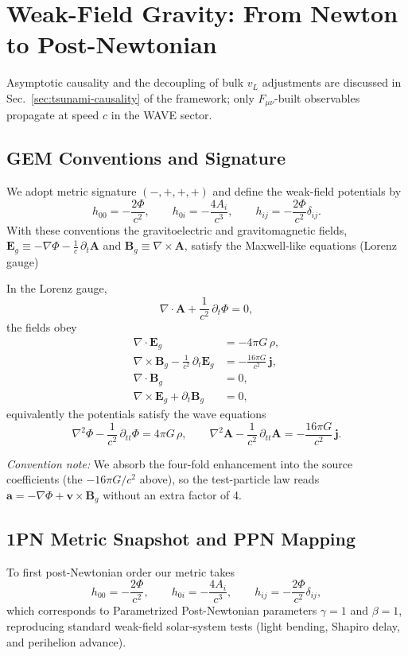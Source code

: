\section{Weak-Field Gravity: From Newton to Post-Newtonian}
Asymptotic causality and the decoupling of bulk $v_L$ adjustments are discussed in Sec.~\ref{sec:tsunami-causality} of the framework; only $F_{\mu\nu}$-built observables propagate at speed $c$ in the WAVE sector.


\subsection*{GEM Conventions and Signature}
We adopt metric signature $(-,+,+,+)$ and define the weak-field potentials by
\begin{equation}
h_{00} = -\frac{2\Phi}{c^2},\qquad
h_{0i} = -\frac{4 A_i}{c^3},\qquad
h_{ij} = -\frac{2\Phi}{c^2}\delta_{ij}.
\end{equation}
With these conventions the gravitoelectric and gravitomagnetic fields,
$\mathbf{E}_g \equiv -\nabla \Phi - \frac{1}{c}\,\partial_t \mathbf{A}$ and
$\mathbf{B}_g \equiv \nabla \times \mathbf{A}$,
satisfy the Maxwell-like equations (Lorenz gauge)

In the Lorenz gauge,
\[
\nabla\!\cdot\!\mathbf{A} + \frac{1}{c^2}\,\partial_t \Phi = 0,
\]
the fields obey
\[
\begin{aligned}
\nabla\!\cdot\!\mathbf{E}_g &= -4\pi G\,\rho,\\
\nabla\!\times\!\mathbf{B}_g - \frac{1}{c^2}\,\partial_t \mathbf{E}_g &= -\frac{16\pi G}{c^2}\,\mathbf{j},\\
\nabla\!\cdot\!\mathbf{B}_g &= 0,\\
\nabla\!\times\!\mathbf{E}_g + \partial_t \mathbf{B}_g &= 0,
\end{aligned}
\]
equivalently the potentials satisfy the wave equations
\[
\nabla^2 \Phi - \frac{1}{c^2}\,\partial_{tt} \Phi = 4\pi G\,\rho,\qquad
\nabla^2 \mathbf{A} - \frac{1}{c^2}\,\partial_{tt} \mathbf{A} = -\frac{16\pi G}{c^2}\,\mathbf{j}.
\]

\emph{Convention note:} We absorb the four-fold enhancement into the source coefficients (the $-16\pi G/c^2$ above), so the test-particle law reads $\mathbf{a}=-\nabla \Phi + \mathbf{v}\times\mathbf{B}_g$ without an extra factor of 4.

\subsection*{1PN Metric Snapshot and PPN Mapping}
To first post-Newtonian order our metric takes
\[
h_{00}=-\frac{2\Phi}{c^2},\qquad h_{0i}=-\frac{4 A_i}{c^3},\qquad h_{ij}=-\frac{2\Phi}{c^2}\delta_{ij},
\]
which corresponds to Parametrized Post-Newtonian parameters
$\gamma=1$ and $\beta=1$, reproducing standard weak-field solar-system tests (light bending, Shapiro delay, and perihelion advance).



